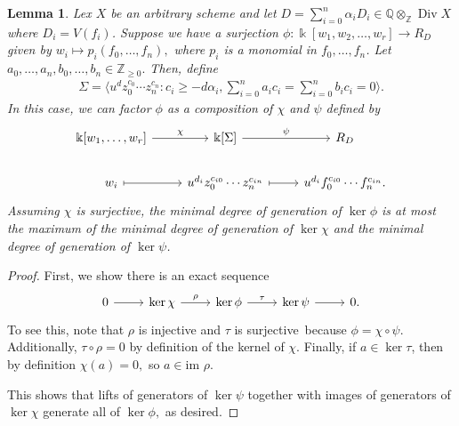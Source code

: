 \documentclass{amsart}
\theoremstyle{plain}
\newtheorem{lem}[thm]{Lemma}
\theoremstyle{definition}
\theoremstyle{remark}
\numberwithin{equation}{section}
\newcommand\bq{{\mathbb Q}}
\newcommand\bz{{\mathbb Z}}
\newcommand\bk{{\Bbbk}}
\newcommand\im{\text{im }}
\DeclareMathOperator\di{Div}
\newcommand\bida{a}
\newcommand\bidb{b}
\begin{document}
\begin{lem}
\label{lem:composite-map}
Lex $X$ be an arbitrary scheme and let $D = \sum_{i=0}^{n}\alpha_i D_i\in \bq \otimes_\bz \di X$ where $D_i = V(f_i)$. Suppose we have a
surjection $\phi\colon \bk[w_1,w_2,\ldots, w_r] \rightarrow R_D$ given by $w_i
\mapsto p_i(f_0, \ldots, f_n),$ where $p_i$ is a monomial in $f_0,\ldots, f_n$.
Let $\bida_0, \ldots, \bida_n, \bidb_0, \ldots, \bidb_n \in \bz_{\geq 0}.$
Then, define
\begin{align*}
	\Sigma = \langle u^d z_0^{c_0} \cdots z_n^{c_n} : c_i \geq -d \alpha_i, \sum_{i=0}^{n} \bida_i c_i = \sum_{i=0}^{n} \bidb_i c_i = 0 \rangle. 
\end{align*}
In this case, we can factor $\phi$ as a composition of $\chi$ and $\psi$ defined by
\[
\begin{tikzcd}
\bk[w_1,\ldots, w_r] \ar {r}{\chi} & \bk[\Sigma] \ar {r}{\psi} & R_D \\
w_i \arrow[mapsto]{r} & u^{d_i}z_0^{c_{i0}} \cdots z_n^{c_{in}} \arrow[mapsto]{r} & u^{d_i}f_0^{c_{i0}} \cdots f_n^{c_{in}}.
\end{tikzcd}
\]
Assuming $\chi$ is surjective, the minimal degree of generation of $\ker \phi$
is at most the maximum of the minimal degree of generation of $\ker \chi$ and
the minimal degree of generation of $\ker \psi$.
\end{lem}
\begin{proof}
First, we show there is an exact sequence
\[
\begin{tikzcd}
0 \ar {r} & \ker \chi \ar{r}{\rho} & \ker \phi \ar {r}{\tau} & \ker \psi \ar r & 0.
\end{tikzcd}
\]
To see this, note that $\rho$ is injective and $\tau$ is surjective\ because
$\phi = \chi \circ \psi$. Additionally, $\tau \circ \rho = 0$ by definition of
the kernel of $\chi$. Finally, if $a \in\ker \tau$, then by definition $\chi(a)
= 0,$ so $a \in \im \rho$.

This shows that lifts of generators of $\ker \psi$ together with images of
generators of $\ker \chi$ generate all of $\ker \phi,$ as desired. 
\end{proof}
\end{document}
